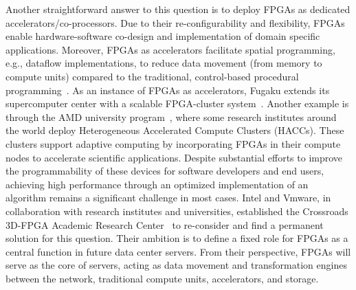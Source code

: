 Another straightforward answer to this question is to deploy %
FPGAs as dedicated %
accelerators/co-processors. %
Due to their re-configurability and flexibility, %
FPGAs enable hardware-software co-design and implementation of domain specific applications. Moreover, FPGAs as accelerators facilitate %
spatial programming, %
e.g., dataflow implementations, to reduce data movement (from memory to compute units) compared to the traditional, control-based procedural programming~\cite{Licht2022PythonDesign}. 
As an instance of FPGAs as accelerators, Fugaku extends its supercomputer center with a scalable FPGA-cluster system~\cite{Sano2023ESSPER:Fugaku}. 
Another example is through the AMD university program~\cite{amd_hacc}, where some research institutes %
around the world deploy Heterogeneous Accelerated Compute Clusters (HACCs).  %
These clusters support adaptive computing by incorporating FPGAs in their compute nodes %
to accelerate scientific applications.
Despite substantial efforts to improve the programmability of these devices for software developers and end users, achieving %
high performance through %
an optimized implementation of an algorithm remains a significant challenge in most cases.
Intel and Vmware, in collaboration with %
research institutes and universities, established the  Crossroads 3D-FPGA Academic Research Center~\cite{crossroads_fpga} to re-consider and find a permanent solution for this question. Their ambition is to define a fixed role for FPGAs as a central function in future data center servers. From %
their perspective, FPGAs will serve as %
the core %
of %
servers, acting as data movement and %
transformation engines between the network, traditional compute units, accelerators, and storage.


